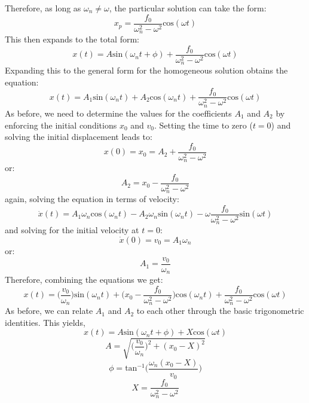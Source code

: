 \documentclass[12pt,letter]{article}
\begin{document}
	Therefore, as long as $\omega_n \neq \omega$, the particular solution can take the form:
	\begin{equation}
		x_p = \frac{f_0}{\omega_n^2-\omega^2}\text{cos}(\omega t)
	\end{equation}						
	This then expands to the total form:
	\begin{equation}
		x(t) = A\text{sin}(\omega_n t + \phi) + \frac{f_0}{\omega_n^2-\omega^2}\text{cos}(\omega t)
	\end{equation}				
	Expanding this to the general form for the homogeneous solution obtains the equation:
	\begin{equation}
		x(t) = A_1\text{sin}(\omega_n t) + A_2\text{cos}(\omega_n t) + \frac{f_0}{\omega_n^2-\omega^2}\text{cos}(\omega t)
	\end{equation}				
	As before, we need to determine the values for the coefficients $A_1$ and $A_2$ by enforcing the initial conditions $x_0$ and $v_0$. Setting the time to zero ($t=0$) and solving the initial displacement leads to:
	\begin{equation}
		x(0) = x_0 = A_2 + \frac{f_0}{\omega_n^2-\omega^2}
	\end{equation}				
	or:
	\begin{equation}
		A_2 = x_0-\frac{f_0}{\omega_n^2-\omega^2}
	\end{equation}	
	again, solving the equation in terms of velocity:
	\begin{equation}
		\dot{x}(t) = A_1\omega_n\text{cos}(\omega_n t) - A_2 \omega_n \text{sin}(\omega_n t) - \omega \frac{f_0}{\omega_n^2-\omega^2}\text{sin}(\omega t)
	\end{equation}	
	and solving for the initial velocity at $t=0$:
	\begin{equation}
		\dot{x}(0) = v_0 =  A_1 \omega_n
	\end{equation}				
	or:
	\begin{equation}
		A_1 = \frac{v_0}{\omega_n}
	\end{equation}				
	Therefore, combining the equations we get:
	\begin{equation}
		x(t) = \Big(\frac{v_0}{\omega_n}\Big)\text{sin}(\omega_n t) + \Big(x_0-\frac{f_0}{\omega_n^2-\omega^2}\Big)\text{cos}(\omega_n t) + \frac{f_0}{\omega_n^2-\omega^2}\text{cos}(\omega t)
	\end{equation}	
	As before, we can relate $A_1$ and $A_2$ to each other through the basic trigonometric identities. This yields, 
	\begin{equation}
		x(t) = A\text{sin}(\omega_n t + \phi) + X\text{cos}(\omega t) 
	\end{equation}				
	\begin{equation}
		A = \sqrt{\bigg(\frac{v_0}{\omega_n}\bigg)^2+(x_0-X)^2}
	\end{equation}				
	\begin{equation}
		\phi = \text{tan}^{-1}\bigg(\frac{\omega_n(x_0-X)}{v_0}\bigg)
	\end{equation}				
	\begin{equation}
		X = \frac{f_0}{\omega_n^2-\omega^2}
	\end{equation}				
	
\end{document}
